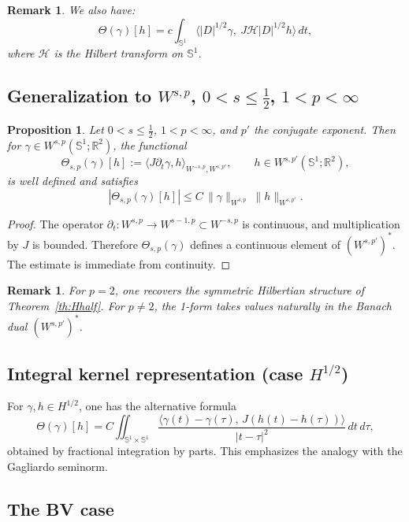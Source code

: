 \documentclass{amsart}
\newcounter{thm}
\newcounter{ex}
\newcounter{re}
\newtheorem{proposition}[thm]{Proposition}
\newtheorem{remark}[thm]{Remark}
\begin{document}
\begin{remark}
We also have:
\[
\Theta(\gamma)[h]=c\int_{\mathbb S^1}\langle |D|^{1/2}\gamma,\ J\mathcal H|D|^{1/2}h\rangle\,dt,
\]
where $\mathcal H$ is the Hilbert transform on $\mathbb S^1$.
\end{remark}

\subsection{Generalization to $W^{s,p}$, $0<s\le\frac{1}{2}$, $1<p<\infty$}

\begin{proposition}
Let $0<s\le \tfrac12$, $1<p<\infty$, and $p'$ the conjugate exponent.
Then for $\gamma\in W^{s,p}(\mathbb S^1;\mathbb R^2)$, the functional
\[
\Theta_{s,p}(\gamma)[h]:=\langle J\partial_t\gamma,h\rangle_{W^{-s,p},W^{s,p'}},
\qquad h\in W^{s,p'}(\mathbb S^1;\mathbb R^2),
\]
is well defined and satisfies
\[
|\Theta_{s,p}(\gamma)[h]|\le C\,\|\gamma\|_{W^{s,p}}\ \|h\|_{W^{s,p'}}.
\]
\end{proposition}

\begin{proof}
The operator $\partial_t:W^{s,p}\to W^{s-1,p}\subset W^{-s,p}$ is continuous,
and multiplication by $J$ is bounded.
Therefore $\Theta_{s,p}(\gamma)$ defines a continuous element
of $(W^{s,p'})^\ast$. The estimate is immediate from continuity.
\end{proof}

\begin{remark}
For $p=2$, one recovers the symmetric Hilbertian structure of
Theorem~\ref{th:Hhalf}. For $p\neq 2$, the 1-form takes values naturally in the
Banach dual $(W^{s,p'})^\ast$.
\end{remark}

\subsection{Integral kernel representation (case $H^{1/2}$)}

For $\gamma,h\in H^{1/2}$, one has the alternative formula
\[
\Theta(\gamma)[h]
= C\iint_{\mathbb S^1\times\mathbb S^1}
\frac{\langle \gamma(t)-\gamma(\tau),\,J(h(t)-h(\tau))\rangle}{|t-\tau|^2}\,dt\,d\tau,
\]
obtained by fractional integration by parts.
This emphasizes the analogy with the Gagliardo seminorm.

\subsection{The BV case}
\end{document}

